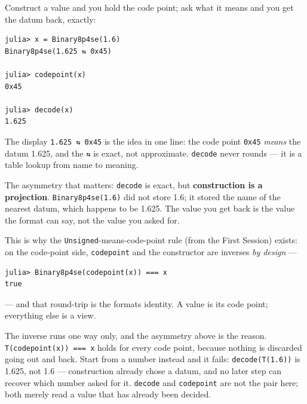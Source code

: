 \label{2573172402139875102}{}


Construct a value and you hold the code point; ask what it means and you get the datum back, exactly:




\nopagebreak[4]
\begin{verbatim}
julia> x = Binary8p4se(1.6)
Binary8p4se(1.625 ⇆ 0x45)

julia> codepoint(x)
0x45

julia> decode(x)
1.625
\end{verbatim}



The display \texttt{1.625 ⇆ 0x45} is the idea in one line: the code point \texttt{0x45} \emph{means} the datum 1.625, and the \texttt{⇆} is exact, not approximate. \texttt{decode} never rounds — it is a table lookup from name to meaning.



The asymmetry that matters: \texttt{decode} is exact, but \textbf{construction is a projection}. \texttt{Binary8p4se(1.6)} did not store 1.6; it stored the name of the nearest datum, which happens to be 1.625. The value you get back is the value the format can say, not the value you asked for.



This is why the \texttt{Unsigned}-means-code-point rule (from the First Session) exists: on the code-point side, \texttt{codepoint} and the constructor are inverses \emph{by design} —




\begin{verbatim}
julia> Binary8p4se(codepoint(x)) === x
true
\end{verbatim}



— and that round-trip is the format{\textquotesingle}s identity. A value is its code point; everything else is a view.



The inverse runs one way only, and the asymmetry above is the reason. \texttt{T(codepoint(x)) === x} holds for every code point, because nothing is discarded going out and back. Start from a number instead and it fails: \texttt{decode(T(1.6))} is 1.625, not 1.6 — construction already chose a datum, and no later step can recover which number asked for it. \texttt{decode} and \texttt{codepoint} are not the pair here; both merely read a value that has already been decided.



